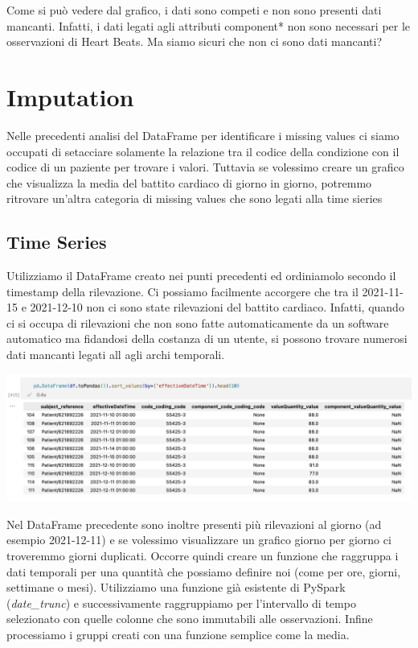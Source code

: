 \documentclass[11pt, oneside]{article}
\begin{document}
Come si può vedere dal grafico, i dati sono competi e non sono presenti dati mancanti. Infatti, i dati legati agli attributi component* non sono necessari per le osservazioni di Heart Beats. Ma siamo sicuri che non ci sono dati mancanti?

\section{Imputation}

Nelle precedenti analisi del DataFrame per identificare i missing values ci siamo occupati di setacciare solamente la relazione tra il codice della condizione con il codice di un paziente per trovare i valori. Tuttavia se volessimo creare un grafico che visualizza la media del battito cardiaco di giorno in giorno, potremmo ritrovare un'altra categoria di missing values che sono legati alla time sieries

\subsection{Time Series}

Utilizziamo il DataFrame creato nei punti precedenti ed ordiniamolo secondo il timestamp della rilevazione. Ci possiamo facilmente accorgere che tra il 2021-11-15 e 2021-12-10 non ci sono state rilevazioni del battito cardiaco. Infatti, quando ci si occupa di rilevazioni che non sono fatte automaticamente da un software automatico ma fidandosi della costanza di un utente, si possono trovare numerosi dati mancanti legati all agli archi temporali.

\begin{center}
\includegraphics[scale=0.45]{2_sort.png}
\end{center}

Nel DataFrame precedente sono inoltre presenti più rilevazioni al giorno (ad esempio 2021-12-11) e se volessimo visualizzare un grafico giorno per giorno ci troveremmo giorni duplicati. Occorre quindi creare un funzione che raggruppa i dati temporali per una quantità che possiamo definire noi (come per ore, giorni, settimane o mesi). Utilizziamo una funzione già esistente di PySpark (\emph{date\_trunc}) e successivamente raggruppiamo per l'intervallo di tempo selezionato con quelle colonne che sono immutabili alle osservazioni. Infine processiamo i gruppi creati con una funzione semplice come la media.
\end{document}

